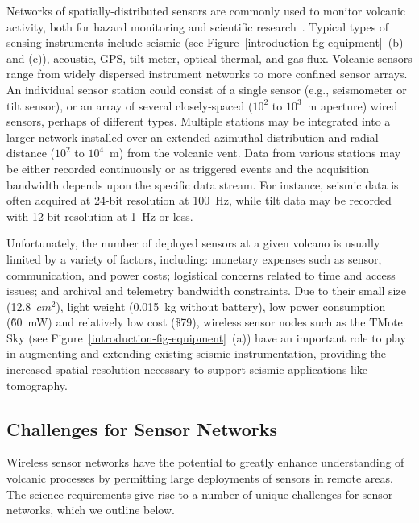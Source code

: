 Networks of spatially-distributed sensors are commonly used to monitor
volcanic activity, both for hazard monitoring and scientific
research~\cite{Scarpa96}. Typical types of sensing instruments include
seismic (see Figure~\ref{introduction-fig-equipment}~(b) and (c)), acoustic,
GPS, tilt-meter, optical thermal, and gas flux. Volcanic sensors range from
widely dispersed instrument networks to more confined sensor arrays. An
individual sensor station could consist of a single sensor (e.g., seismometer
or tilt sensor), or an array of several closely-spaced ($10^2$ to $10^3$~m
aperture) wired sensors, perhaps of different types. Multiple stations may be
integrated into a larger network installed over an extended azimuthal
distribution and radial distance ($10^2$ to $10^4$~m) from the volcanic vent.
Data from various stations may be either recorded continuously or as
triggered events and the acquisition bandwidth depends upon the specific data
stream. For instance, seismic data is often acquired at 24-bit resolution at
100~Hz, while tilt data may be recorded with 12-bit resolution at 1~Hz or
less.

Unfortunately, the number of deployed sensors at a given volcano is usually
limited by a variety of factors, including: monetary expenses such as sensor,
communication, and power costs; logistical concerns related to time and
access issues; and archival and telemetry bandwidth constraints. Due to their
small size (12.8~$cm^2$), light weight (0.015~kg without battery), low power
consumption (\~60~mW) and relatively low cost (\$79), wireless sensor nodes
such as the TMote Sky (see Figure~\ref{introduction-fig-equipment}~(a)) have
an important role to play in augmenting and extending existing seismic
instrumentation, providing the increased spatial resolution necessary to
support seismic applications like tomography.

\subsection{Challenges for Sensor Networks}

Wireless sensor networks have the potential to greatly enhance understanding
of volcanic processes by permitting large deployments of sensors in remote
areas. The science requirements give rise to a number of unique challenges
for sensor networks, which we outline below.

